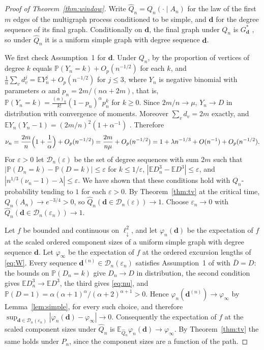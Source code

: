 \documentclass[11pt]{amsart}
\theoremstyle{remark}
\numberwithin{equation}{section}
\newcommand{\PP}{\mathbb{P}}
\newcommand{\EE}{\mathbb{E}}
\newcommand{\ldown}{\ell^2_{\downarrow}}
\begin{document}
\begin{proof}[Proof of Theorem~\ref{thm:window}]
Write $\widehat Q_n=Q_n(\cdot\mid A_n)$ for the law of the first $m$ edges of the multigraph process conditioned to be simple, and $\boldsymbol d$ for the degree sequence of its final graph. Conditionally on $\boldsymbol d$, the final graph under $Q_n$ is $G^*_{\boldsymbol d}$ \cite[Theorem~2.4]{JW21}, so under $\widehat Q_n$ it is a uniform simple graph with degree sequence $\boldsymbol d$.

We first check Assumption~1 for $\boldsymbol d$. Under $Q_n$, by \cite[Theorem~2.5 and Remark~2.6]{JW21} the proportion of vertices of degree $k$ equals $\PP(Y_n=k)+O_p(n^{-1/2})$ for each $k$, and $\frac1n\sum_vd_v^j=\EE Y_n^j+O_p(n^{-1/2})$ for $j\le3$, where $Y_n$ is negative binomial with parameters $\alpha$ and $p_n=2m/(n\alpha+2m)$, that is, $\PP(Y_n=k)=\frac{(\alpha)_k}{k!}(1-p_n)^{\alpha}p_n^{k}$ for $k\ge0$. Since $2m/n\to\mu$, $Y_n\to D$ in distribution with convergence of moments. Moreover $\sum_vd_v=2m$ exactly, and $\EE Y_n(Y_n-1)=(2m/n)^2(1+\alpha^{-1})$ \cite[Remark~2.7]{JW21}. Therefore
\[
\nu_n=\frac{2m}{n}\Bigl(1+\frac1\alpha\Bigr)+O_p(n^{-1/2})=\frac{2m}{n\mu}+O_p(n^{-1/2})=1+\lambda n^{-1/3}+O(n^{-1})+O_p(n^{-1/2}).
\]
For $\varepsilon>0$ let $\mathcal D_n(\varepsilon)$ be the set of degree sequences with sum $2m$ such that $|\PP(D_n=k)-\PP(D=k)|\le\varepsilon$ for $k\le1/\varepsilon$, $|\EE D_n^3-\EE D^3|\le\varepsilon$, and $|n^{1/3}(\nu_n-1)-\lambda|\le\varepsilon$. We have shown that these conditions hold with $Q_n$-probability tending to $1$ for each $\varepsilon>0$. By Theorem~\ref{thm:tv} at the critical time, $Q_n(A_n)\to e^{-3/4}>0$, so $\widehat Q_n(\boldsymbol d\in\mathcal D_n(\varepsilon))\to1$. Choose $\varepsilon_n\to0$ with $\widehat Q_n(\boldsymbol d\in\mathcal D_n(\varepsilon_n))\to1$.

Let $f$ be bounded and continuous on $\ldown$, and let $\varphi_n(\boldsymbol d)$ be the expectation of $f$ at the scaled ordered component sizes of a uniform simple graph with degree sequence $\boldsymbol d$. Let $\varphi_\infty$ be the expectation of $f$ at the ordered excursion lengths of \eqref{eq:W}. Every sequence $\boldsymbol d^{(n)}\in\mathcal D_n(\varepsilon_n)$ satisfies Assumption~1 of \cite{DHLS17} with $\bar D=D$: the bounds on $\PP(D_n=k)$ give $D_n\to D$ in distribution, the second condition gives $\EE D_n^3\to\EE D^3$, the third gives \eqref{eq:nu}, and $\PP(D=1)=\alpha(\alpha+1)^\alpha/(\alpha+2)^{\alpha+1}>0$. Hence $\varphi_n(\boldsymbol d^{(n)})\to \varphi_\infty$ by Lemma~\ref{lem:simple}, for every such choice, and therefore $\sup_{\boldsymbol d\in\mathcal D_n(\varepsilon_n)}|\varphi_n(\boldsymbol d)-\varphi_\infty|\to0$. Consequently the expectation of $f$ at the scaled component sizes under $\widehat Q_n$ is $\EE_{\widehat Q_n}\varphi_n(\boldsymbol d)\to \varphi_\infty$. By Theorem~\ref{thm:tv} the same holds under $P_n$, since the component sizes are a function of the path.


\end{proof}
\end{document}
